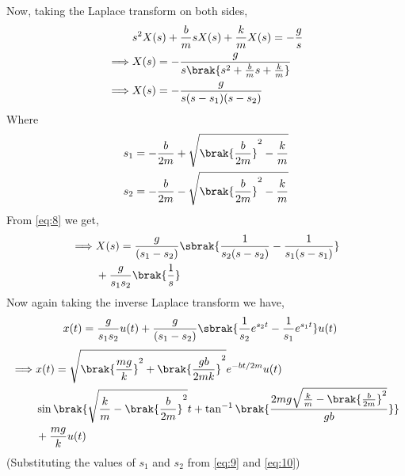 \documentclass[journal,12pt,twocolumn]{IEEEtran}
\theoremstyle{remark}
\begin{document}
    Now, taking the Laplace transform on both sides,
    \begin{align}
        &s^2X(s)+\frac{b}{m}sX(s)+\frac{k}{m}X(s)=-\frac{g}{s} \label{eq:6}\\
        \implies &X(s)=-\frac{g}{s\brak{s^2+\frac{b}{m}s+\frac{k}{m}}} \label{eq:7}\\
        \implies &X(s)=-\frac{g}{s(s-s_1)(s-s_2)} \label{eq:8}
    \end{align}
    Where
    \begin{align}
        &s_1=-\frac{b}{2m}+\sqrt{\brak{\frac{b}{2m}}^2-\frac{k}{m}} \label{eq:9}\\
        &s_2=-\frac{b}{2m}-\sqrt{\brak{\frac{b}{2m}}^2-\frac{k}{m}} \label{eq:10}
    \end{align}
    From \eqref{eq:8} we get,
    \begin{align}
        \begin{split}
            \implies &X(s)=\frac{g}{(s_1-s_2)}\sbrak{\frac{1}{s_2(s-s_2)}-\frac{1}{s_1(s-s_1)}} \\
            &+\frac{g}{s_1s_2}\brak{\frac{1}{s}} \label{eq:11}
        \end{split}
    \end{align}
    Now again taking the inverse Laplace transform we have,
    \begin{align}
        &x(t)=\frac{g}{s_1s_2}u(t)+\frac{g}{(s_1-s_2)}\sbrak{\frac{1}{s_2}e^{s_2t}-\frac{1}{s_1}e^{s_1t}}u(t)\label{eq:12}
    \end{align}
    \begin{align}
    \begin{split}
    \implies &x(t) =\sqrt{\brak{\frac{mg}{k}}^2 + \brak{\frac{gb}{2mk}}^2}e^{-bt/2m}u(t) \\
            &\sin{\brak{\sqrt{\frac{k}{m} - \brak{\frac{b}{2m}}^2}t + \tan^{-1}\brak{\frac{2mg\sqrt{\frac{k}{m} - \brak{\frac{b}{2m}}^2}}{gb}}}} \\
            &+ \frac{mg}{k}
        u(t) \label{eq:13}
\end{split}
\end{align}
    (Substituting the values of $s_1$ and $s_2$ from \eqref{eq:9} and \eqref{eq:10})
\end{document}
